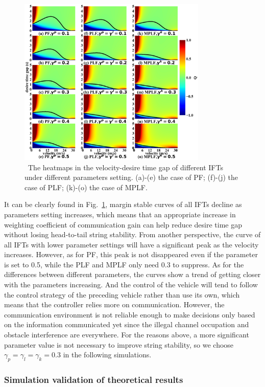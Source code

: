 \documentclass[journal]{IEEEtran}
\begin{document}
\begin{figure}
\includegraphics[width=9cm]{fig4.png}
\caption{~The heatmaps in the velocity-desire time gap of different IFTs under different parameters setting. (a)-(e) the case of PF; (f)-(j) the case of PLF; (k)-(o) the case of MPLF.} 
\label{Figure4}
\end{figure}


It can be clearly found in Fig.~\ref{Figure4}, margin stable curves of all IFTs decline as parameters setting increases, which means that an appropriate increase in weighting coefficient of communication gain can help reduce desire time gap without losing head-to-tail string stability. From another perspective, the curve of all IFTs with lower parameter settings will have a significant peak as the velocity increases. However, as for PF, this peak is not disappeared even if the parameter is set to 0.5, while the PLF and MPLF only need 0.3 to suppress. As for the differences between different parameters, the curves show a trend of getting closer with the parameters increasing. And the control of the vehicle will tend to follow the control strategy of the preceding vehicle rather than use its own, which means that the controller relies more on communication. However, the communication environment is not reliable enough to make decisions only based on the information communicated yet since the illegal channel occupation and obstacle interference are everywhere. For the reasons above, a more significant parameter value is not necessary to improve string stability, so we choose $\gamma_p=\gamma_l=\gamma_k=0.3$ in the following simulations.


\subsubsection{Simulation validation of theoretical results}
\label{Section 5.2.3}
\end{document}
